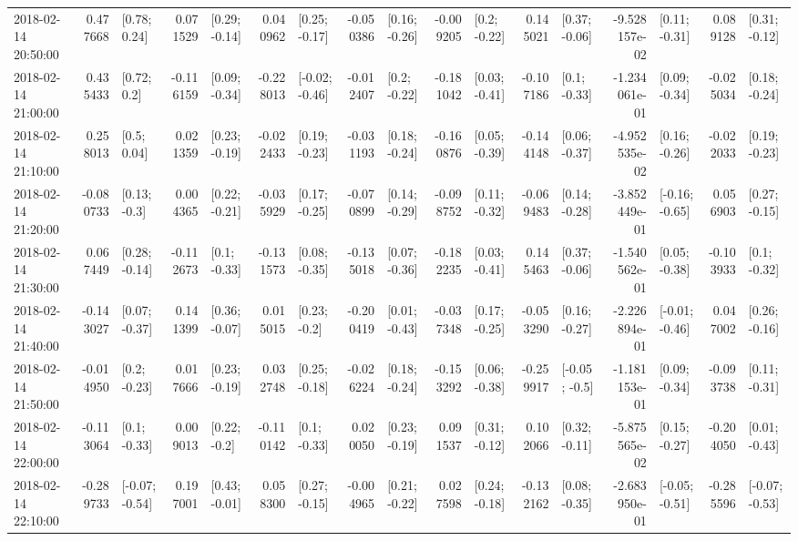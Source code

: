 \begin{tabular}{lrlrlrlrlrlrlrlrl}
2018-02-14 20:50:00 &  0.477668 &    [0.78; 0.24] &  0.071529 &   [0.29; -0.14] &  0.040962 &   [0.25; -0.17] & -0.050386 &   [0.16; -0.26] & -0.009205 &    [0.2; -0.22] &  0.145021 &   [0.37; -0.06] & -9.528157e-02 &   [0.11; -0.31] &  0.089128 &   [0.31; -0.12] \\
2018-02-14 21:00:00 &  0.435433 &     [0.72; 0.2] & -0.116159 &   [0.09; -0.34] & -0.228013 &  [-0.02; -0.46] & -0.012407 &    [0.2; -0.22] & -0.181042 &   [0.03; -0.41] & -0.107186 &    [0.1; -0.33] & -1.234061e-01 &   [0.09; -0.34] & -0.025034 &   [0.18; -0.24] \\
2018-02-14 21:10:00 &  0.258013 &     [0.5; 0.04] &  0.021359 &   [0.23; -0.19] & -0.022433 &   [0.19; -0.23] & -0.031193 &   [0.18; -0.24] & -0.160876 &   [0.05; -0.39] & -0.144148 &   [0.06; -0.37] & -4.952535e-02 &   [0.16; -0.26] & -0.022033 &   [0.19; -0.23] \\
2018-02-14 21:20:00 & -0.080733 &    [0.13; -0.3] &  0.004365 &   [0.22; -0.21] & -0.035929 &   [0.17; -0.25] & -0.070899 &   [0.14; -0.29] & -0.098752 &   [0.11; -0.32] & -0.069483 &   [0.14; -0.28] & -3.852449e-01 &  [-0.16; -0.65] &  0.056903 &   [0.27; -0.15] \\
2018-02-14 21:30:00 &  0.067449 &   [0.28; -0.14] & -0.112673 &    [0.1; -0.33] & -0.131573 &   [0.08; -0.35] & -0.135018 &   [0.07; -0.36] & -0.182235 &   [0.03; -0.41] &  0.145463 &   [0.37; -0.06] & -1.540562e-01 &   [0.05; -0.38] & -0.103933 &    [0.1; -0.32] \\
2018-02-14 21:40:00 & -0.143027 &   [0.07; -0.37] &  0.141399 &   [0.36; -0.07] &  0.015015 &    [0.23; -0.2] & -0.200419 &   [0.01; -0.43] & -0.037348 &   [0.17; -0.25] & -0.053290 &   [0.16; -0.27] & -2.226894e-01 &  [-0.01; -0.46] &  0.047002 &   [0.26; -0.16] \\
2018-02-14 21:50:00 & -0.014950 &    [0.2; -0.23] &  0.017666 &   [0.23; -0.19] &  0.032748 &   [0.25; -0.18] & -0.026224 &   [0.18; -0.24] & -0.153292 &   [0.06; -0.38] & -0.259917 &   [-0.05; -0.5] & -1.181153e-01 &   [0.09; -0.34] & -0.093738 &   [0.11; -0.31] \\
2018-02-14 22:00:00 & -0.113064 &    [0.1; -0.33] &  0.009013 &    [0.22; -0.2] & -0.110142 &    [0.1; -0.33] &  0.020050 &   [0.23; -0.19] &  0.091537 &   [0.31; -0.12] &  0.102066 &   [0.32; -0.11] & -5.875565e-02 &   [0.15; -0.27] & -0.204050 &   [0.01; -0.43] \\
2018-02-14 22:10:00 & -0.289733 &  [-0.07; -0.54] &  0.197001 &   [0.43; -0.01] &  0.058300 &   [0.27; -0.15] & -0.004965 &   [0.21; -0.22] &  0.027598 &   [0.24; -0.18] & -0.132162 &   [0.08; -0.35] & -2.683950e-01 &  [-0.05; -0.51] & -0.285596 &  [-0.07; -0.53] \\

\end{tabular}
